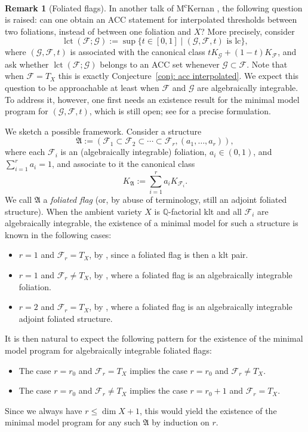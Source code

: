 \documentclass[11pt,reqno]{amsart}
\numberwithin{equation}{section}
\newcommand{\lct}{\operatorname{lct}}
\newcommand{\Aa}{{\mathfrak{A}}}
\newcommand{\Ff}{\mathcal{F}}
\theoremstyle{definition}
\newtheorem{rem}[thm]{Remark}
\begin{document}
\begin{rem}[Foliated flags]
    In another talk of M\textsuperscript{c}Kernan \cite[50:55]{McK23}, the following question is raised: can one obtain an ACC statement for interpolated thresholds between two foliations, instead of between one foliation and $X$? More precisely, consider
    $$\lct(\Ff;\mathcal{G}):=\sup\{t\in [0,1]\mid (\mathcal{G},\Ff,t)\text{ is lc}\},$$
    where $(\mathcal{G},\Ff,t)$ is associated with the canonical class $tK_{\mathcal{G}}+(1-t)K_{\Ff}$, and ask whether $\lct(\Ff;\mathcal{G})$ belongs to an ACC set whenever $\mathcal{G}\subset\Ff$. Note that when $\Ff=T_X$ this is exactly Conjecture~\ref{conj: acc interpolated}. We expect this question to be approachable at least when $\Ff$ and $\mathcal{G}$ are algebraically integrable. To address it, however, one first needs an existence result for the minimal model program for $(\mathcal{G},\Ff,t)$, which is still open; see \cite[Conjecture~A.10]{Cas+24} for a precise formulation.

    We sketch a possible framework. Consider a structure
    $$\Aa:=(\Ff_1\subset\Ff_2\subset\cdots\subset\Ff_r,(a_1,\dots,a_r)),$$
    where each $\Ff_i$ is an (algebraically integrable) foliation, $a_i\in (0,1)$, and $\sum_{i=1}^r a_i=1$, and associate to it the canonical class
    $$K_{\Aa}:=\sum_{i=1}^r a_iK_{\Ff_i}.$$
    We call $\Aa$ a \emph{foliated flag} (or, by abuse of terminology, still an adjoint foliated structure). When the ambient variety $X$ is $\mathbb Q$-factorial klt and all $\Ff_i$ are algebraically integrable, the existence of a minimal model for such a structure is known in the following cases:
    \begin{itemize}
        \item $r=1$ and $\Ff_r=T_X$, by \cite{BCHM10}, since a foliated flag is then a klt pair.
        \item $r=1$ and $\Ff_r\neq T_X$, by \cite{ACSS21,CHLX23,CS25c,LMX25}, where a foliated flag is an algebraically integrable foliation.
        \item $r=2$ and $\Ff_r=T_X$, by \cite{Cas+25a}, where a foliated flag is an algebraically integrable adjoint foliated structure.
    \end{itemize}
    It is then natural to expect the following pattern for the existence of the minimal model program for algebraically integrable foliated flags:
    \begin{itemize}
        \item The case $r=r_0$ and $\Ff_r=T_X$ implies the case $r=r_0$ and $\Ff_r\neq T_X$.
        \item The case $r=r_0$ and $\Ff_r\neq T_X$ implies the case $r=r_0+1$ and $\Ff_r=T_X$.
    \end{itemize}
    Since we always have $r\leq \dim X+1$, this would yield the existence of the minimal model program for any such $\Aa$ by induction on $r$.
\end{rem}
\end{document}
